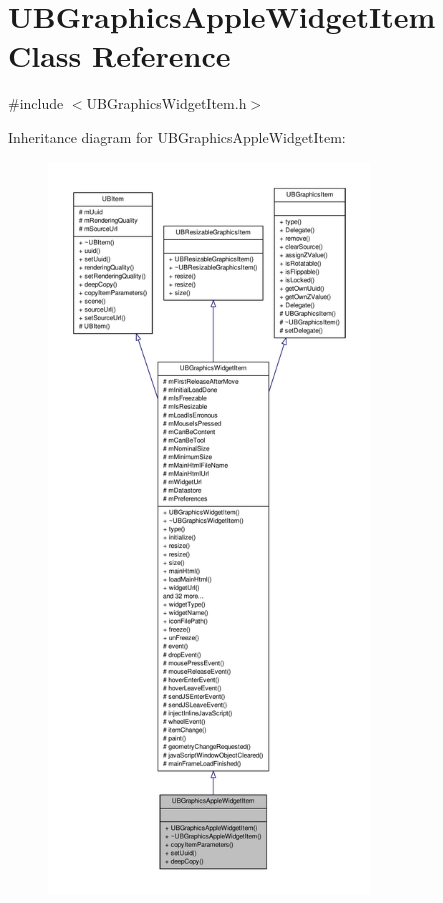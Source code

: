 \hypertarget{class_u_b_graphics_apple_widget_item}{\section{U\-B\-Graphics\-Apple\-Widget\-Item Class Reference}
\label{dd/d03/class_u_b_graphics_apple_widget_item}
}


{\ttfamily \#include $<$U\-B\-Graphics\-Widget\-Item.\-h$>$}



Inheritance diagram for U\-B\-Graphics\-Apple\-Widget\-Item\-:
\nopagebreak
\begin{figure}[H]
\begin{center}
\leavevmode
\includegraphics[height=550pt]{dd/d1d/class_u_b_graphics_apple_widget_item__inherit__graph}
\end{center}
\end{figure}


